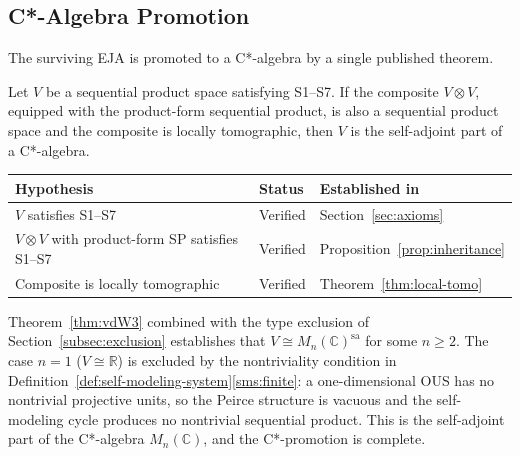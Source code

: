\subsection{C*-Algebra Promotion}\label{subsec:cstar}

The surviving EJA is promoted to a C*-algebra by a single published
theorem.

\begin{theorem}\label{thm:vdW3}
Let $V$ be a sequential product space satisfying S1--S7. If the
composite $V\otimes V$, equipped with the product-form sequential
product, is also a sequential product space and the composite is locally
tomographic, then $V$ is the self-adjoint part of a C*-algebra.
\end{theorem}

\begin{center}
\begin{tabular}{lll}
\toprule
\textbf{Hypothesis} & \textbf{Status} & \textbf{Established in} \\
\midrule
$V$ satisfies S1--S7
  & Verified & Section~\ref{sec:axioms} \\
$V\otimes V$ with product-form SP satisfies S1--S7
  & Verified & Proposition~\ref{prop:inheritance} \\
Composite is locally tomographic
  & Verified & Theorem~\ref{thm:local-tomo} \\
\bottomrule
\end{tabular}
\end{center}

\noindent
Theorem~\ref{thm:vdW3} combined with the type exclusion of
Section~\ref{subsec:exclusion} establishes that
$V \cong M_n(\mathbb{C})^{\mathrm{sa}}$ for some $n \ge 2$.  The case
$n = 1$ ($V \cong \mathbb{R}$) is excluded by the nontriviality
condition in
Definition~\ref{def:self-modeling-system}\ref{sms:finite}: a
one-dimensional OUS has no nontrivial projective units, so the
Peirce structure is vacuous and the self-modeling cycle produces no
nontrivial sequential product.  This is
the self-adjoint part of the C*-algebra $M_n(\mathbb{C})$, and the
C*-promotion is complete.

